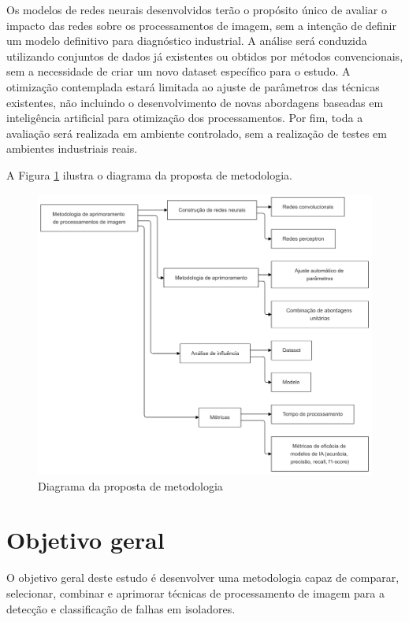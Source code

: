 Os modelos de redes neurais desenvolvidos terão o propósito único de avaliar o impacto das redes sobre os processamentos de imagem, sem a intenção de definir um modelo definitivo para diagnóstico industrial. A análise será conduzida utilizando conjuntos de dados já existentes ou obtidos por métodos convencionais, sem a necessidade de criar um novo dataset específico para o estudo. A otimização contemplada estará limitada ao ajuste de parâmetros das técnicas existentes, não incluindo o desenvolvimento de novas abordagens baseadas em inteligência artificial para otimização dos processamentos. Por fim, toda a avaliação será realizada em ambiente controlado, sem a realização de testes em ambientes industriais reais.

A Figura \ref{fig:proposta} ilustra o diagrama da proposta de metodologia.

\begin{figure}[h]
    \centering
    \includegraphics[width=\textwidth]{img/proposta.png}
    \caption{Diagrama da proposta de metodologia}
    \label{fig:proposta}
\end{figure}

\section{Objetivo geral}

O objetivo geral deste estudo é desenvolver uma metodologia capaz de comparar, selecionar, combinar e aprimorar técnicas de processamento de imagem para a detecção e classificação de falhas em isoladores.

